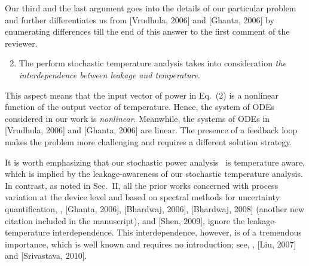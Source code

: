\begin{authors}
Our third and the last argument goes into the details of our particular problem and further differentiates us from [Vrudhula, 2006] and [Ghanta, 2006] by enumerating differences till the end of this answer to the first comment of the reviewer.
\begin{enumerate}
  \setcounter{enumi}{1}
  \item The perform stochastic temperature analysis takes into consideration \emph{the interdependence between leakage and temperature}.
\end{enumerate}
This aspect means that the input vector of power in Eq.~(2) is a nonlinear function of the output vector of temperature.
Hence, the system of ODEs considered in our work is \emph{nonlinear}.
Meanwhile, the systems of ODEs in [Vrudhula, 2006] and [Ghanta, 2006] are linear.
The presence of a feedback loop makes the problem more challenging and requires a different solution strategy.

It is worth emphasizing that our stochastic power analysis \perse\ is temperature aware, which is implied by the leakage-awareness of our stochastic temperature analysis.
In contrast, as noted in Sec.~II, all the prior works concerned with process variation at the device level and based on spectral methods for uncertainty quantification, \ie, [Ghanta, 2006], [Bhardwaj, 2006], [Bhardwaj, 2008] (another new citation included in the manuscript), and [Shen, 2009], ignore the leakage-temperature interdependence.
This interdependence, however, is of a tremendous importance, which is well known and requires no introduction; see, \eg, [Liu, 2007] and [Srivastava, 2010].


\end{authors}
